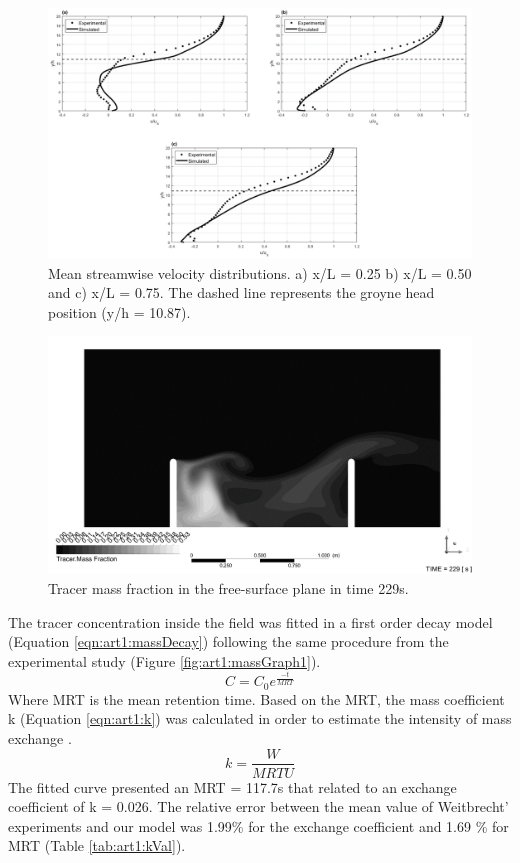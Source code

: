 \begin{figure}[!ht]
\centering
\includegraphics[width=\linewidth]{../images/art1/imgMassExchange4.png}
\caption{Mean streamwise velocity distributions. a) x/L = 0.25 b) x/L = 0.50 and c) x/L = 0.75. The dashed line represents the groyne head position (y/h = 10.87).}
\label{fig:art1:graphs}
\end{figure}
\begin{figure}[!ht]
\centering
\includegraphics[width=\linewidth]{../images/art1/imgMassExchange5.png}
\caption{Tracer mass fraction in the free-surface plane in time 229s.}
\label{fig:art1:tracerContour}
\end{figure}

The tracer concentration inside the field was fitted in a first order decay model (Equation \ref{eqn:art1:massDecay}) following the same procedure from the experimental study (Figure \ref{fig:art1:massGraph1}).
\begin{equation}
C=C_0 e^{\frac{-t}{MRT}}
\label{eqn:art1:massDecay}
\end{equation}
Where MRT is the mean retention time. Based on the MRT, the mass coefficient k (Equation \ref{eqn:art1:k}) was calculated in order to estimate the intensity of mass exchange \cite{weitbrecht2001}.
\begin{equation}
k=\frac{W}{MRT U}
\label{eqn:art1:k}
\end{equation}The fitted curve presented an MRT = 117.7s that related to an exchange coefficient of k = 0.026. The relative error between the mean value of Weitbrecht’ experiments and our model was 1.99\% for the exchange coefficient and 1.69 \% for MRT (Table \ref{tab:art1:kVal}).


